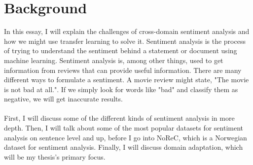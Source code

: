 \chapter{Background}
\label{sec:lab}
In this essay, I will explain the challenges of cross-domain sentiment analysis and how we might use transfer learning to solve it.
Sentiment analysis is the process of trying to understand the sentiment behind a statement or document using machine learning. Sentiment analysis is, among other things, used to get information from reviews that can provide useful information.
There are many different ways to formulate a sentiment. A movie review might state, "The movie is not bad at all.". If we simply look for words like "bad" and classify them as negative, we will get inaccurate results.\\\\
First, I will discuss some of the different kinds of sentiment analysis in more depth. Then, I will talk about some of the most popular datasets for sentiment analysis on sentence level and up, before I go into NoReC, which is a Norwegian dataset for sentiment analysis. Finally, I will discuss domain adaptation, which will be my thesis's primary focus.
\newpage


